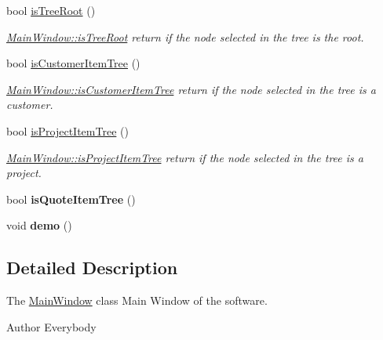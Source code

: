 \begin{DoxyCompactItemize}
bool \hyperlink{classMainWindow_a9e01c4b4fb06ddff0aca86b4ffbb5743}{is\+Tree\+Root} ()
\begin{DoxyCompactList}\small\item\em \hyperlink{classMainWindow_a9e01c4b4fb06ddff0aca86b4ffbb5743}{Main\+Window\+::is\+Tree\+Root} return if the node selected in the tree is the root. \end{DoxyCompactList}\item 
bool \hyperlink{classMainWindow_a9665f7564352d678a7886815d375a13a}{is\+Customer\+Item\+Tree} ()
\begin{DoxyCompactList}\small\item\em \hyperlink{classMainWindow_a9665f7564352d678a7886815d375a13a}{Main\+Window\+::is\+Customer\+Item\+Tree} return if the node selected in the tree is a customer. \end{DoxyCompactList}\item 
bool \hyperlink{classMainWindow_ae6f67694a02c0da2aca08c009ccb4b62}{is\+Project\+Item\+Tree} ()
\begin{DoxyCompactList}\small\item\em \hyperlink{classMainWindow_ae6f67694a02c0da2aca08c009ccb4b62}{Main\+Window\+::is\+Project\+Item\+Tree} return if the node selected in the tree is a project. \end{DoxyCompactList}\item 
\hypertarget{classMainWindow_a2eefa7a0b73b7cea221abc45fa4e1d2b}{bool {\bfseries is\+Quote\+Item\+Tree} ()}\label{classMainWindow_a2eefa7a0b73b7cea221abc45fa4e1d2b}

\item 
\hypertarget{classMainWindow_a8c452fbba06279ce9116970a6f0808ed}{void {\bfseries demo} ()}\label{classMainWindow_a8c452fbba06279ce9116970a6f0808ed}

\end{DoxyCompactItemize}


\subsection{Detailed Description}
The \hyperlink{classMainWindow}{Main\+Window} class Main Window of the software. 

\begin{DoxyAuthor}{Author}
Everybody 
\end{DoxyAuthor}



